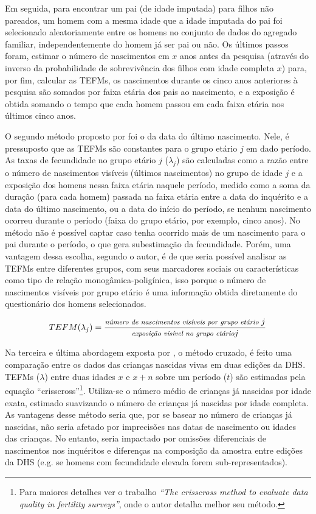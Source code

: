 Em seguida, para encontrar um pai (de idade imputada) para filhos não pareados, um homem com a mesma idade que a idade imputada do pai  foi selecionado aleatoriamente entre os homens no conjunto de dados do agregado familiar, independentemente do homem já ser pai ou não. Os últimos passos foram, estimar o número de nascimentos em $x$ anos antes da pesquisa (através do inverso da probabilidade de sobrevivência dos filhos com idade completa $x$) para, por fim, calcular as TEFMs, os nascimentos durante os cinco anos anteriores à pesquisa são somados por faixa etária dos pais ao nascimento, e a exposição é obtida somando o tempo que cada homem passou em cada faixa etária nos últimos cinco anos.

O segundo método proposto por  foi o da data do último nascimento. Nele, é pressuposto que as TEFMs são constantes para o grupo etário $j$ em dado período. As taxas de fecundidade no grupo etário $j$ ($\lambda_{j}$) são calculadas como a razão entre o número de nascimentos visíveis (últimos nascimentos) no grupo de idade $j$ e a exposição dos homens nessa faixa etária naquele período, medido como a soma da duração (para cada homem) passada na faixa etária entre a data do inquérito e a data do último nascimento, ou a data do início do período, se nenhum nascimento ocorreu durante o período (faixa do grupo etário, por exemplo, cinco anos). No método não é possível captar caso tenha ocorrido mais de um nascimento para o pai durante o período, o que gera subestimação da fecundidade. Porém, uma vantagem dessa escolha, segundo o autor, é de que seria possível  analisar as TEFMs entre diferentes grupos, com seus marcadores sociais ou características como tipo de relação monogâmica-poligínica, isso porque o número de nascimentos visíveis por grupo etário 
 é uma informação obtida diretamente do questionário dos homens selecionados.  


\begin{equation}
   TEFM (\lambda_{j}) = \frac{\text{\footnotesize \textit{número de nascimentos visíveis por grupo etário} }j}{\text{\footnotesize \textit{exposição visível no grupo etário}}j}
\end{equation}


Na terceira e última abordagem exposta por , o método cruzado, é feito uma comparação entre os dados das crianças nascidas vivas em duas edições da DHS. TEFMs ($\lambda$) entre duas idades $x$ e $x+n$ sobre um período ($t$) são estimadas pela equação “crisscross”\footnote{Para maiores detalhes ver o trabalho \textit{“The crisscross method to evaluate data quality in fertility surveys”}\cite{schoumaker2014crisscross}, onde o autor detalha melhor seu método.}. Utiliza-se o número médio de crianças já nascidas por idade exata, estimado suavizando o número de crianças já nascidas por idade completa. As vantagens desse método seria que, por se basear no número de crianças já nascidas, não seria afetado por imprecisões nas datas de nascimento ou idades das crianças. No entanto, seria impactado por omissões diferenciais de nascimentos nos inquéritos e diferenças na composição da amostra entre edições da DHS (e.g. se homens com fecundidade elevada forem sub-representados).

